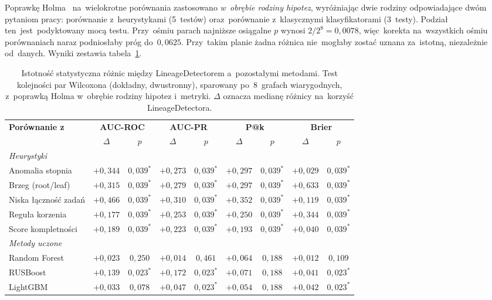 \documentclass[polish,master,a4paper,oneside]{ppfcmthesis}
\renewcommand{\_}{\origtextunderscore\ifmmode\else\allowbreak\fi}
\begin{document}
Poprawkę Holma~\cite{Holm1979} na~wielokrotne porównania zastosowano \emph{w~obrębie rodziny
hipotez}, wyróżniając dwie rodziny odpowiadające dwóm pytaniom pracy:
porównanie z~heurystykami (5~testów) oraz~porównanie z~klasycznymi
klasyfikatorami (3~testy). Podział ten~jest~podyktowany mocą testu. Przy~ośmiu
parach najniższe osiągalne $p$ wynosi $2/2^{8} = 0{,}0078$, więc~korekta
na~wszystkich ośmiu porównaniach naraz podniosłaby próg do~$0{,}0625$.
Przy~takim planie żadna różnica nie~mogłaby zostać uznana za~istotną,
niezależnie od~danych. Wyniki zestawia tabela~\ref{tab:istotnosc}.

\begin{table}[ht]
\centering
\caption[Istotność statystyczna różnic między metodami]{Istotność statystyczna różnic między LineageDetectorem a~pozostałymi
metodami. Test kolejności par Wilcoxona (dokładny, dwustronny), sparowany
po~8~grafach wiarygodnych, z~poprawką Holma w~obrębie rodziny hipotez i~metryki.
$\Delta$ oznacza medianę różnicy na~korzyść LineageDetectora.}
\label{tab:istotnosc}
\small
\begin{tabular}{lcccccccc}
\toprule
\textbf{Porównanie z} & \multicolumn{2}{c}{\textbf{AUC-ROC}} & \multicolumn{2}{c}{\textbf{AUC-PR}} & \multicolumn{2}{c}{\textbf{P@k}} & \multicolumn{2}{c}{\textbf{Brier}} \\
\cmidrule(lr){2-3} \cmidrule(lr){4-5} \cmidrule(lr){6-7} \cmidrule(lr){8-9}
 & $\Delta$ & $p$ & $\Delta$ & $p$ & $\Delta$ & $p$ & $\Delta$ & $p$ \\
\midrule
\multicolumn{9}{l}{\emph{Heurystyki}} \\
Anomalia stopnia & $+0{,}344$ & $0{,}039^{*}$ & $+0{,}273$ & $0{,}039^{*}$ & $+0{,}297$ & $0{,}039^{*}$ & $+0{,}029$ & $0{,}039^{*}$ \\
Brzeg (root/leaf) & $+0{,}315$ & $0{,}039^{*}$ & $+0{,}279$ & $0{,}039^{*}$ & $+0{,}297$ & $0{,}039^{*}$ & $+0{,}633$ & $0{,}039^{*}$ \\
Niska łączność zadań & $+0{,}466$ & $0{,}039^{*}$ & $+0{,}310$ & $0{,}039^{*}$ & $+0{,}352$ & $0{,}039^{*}$ & $+0{,}119$ & $0{,}039^{*}$ \\
Reguła korzenia & $+0{,}177$ & $0{,}039^{*}$ & $+0{,}253$ & $0{,}039^{*}$ & $+0{,}250$ & $0{,}039^{*}$ & $+0{,}344$ & $0{,}039^{*}$ \\
Score kompletności & $+0{,}189$ & $0{,}039^{*}$ & $+0{,}223$ & $0{,}039^{*}$ & $+0{,}193$ & $0{,}039^{*}$ & $+0{,}040$ & $0{,}039^{*}$ \\
\midrule
\multicolumn{9}{l}{\emph{Metody uczone}} \\
Random Forest & $+0{,}023$ & $0{,}250$ & $+0{,}014$ & $0{,}461$ & $+0{,}064$ & $0{,}188$ & $+0{,}012$ & $0{,}109$ \\
RUSBoost & $+0{,}139$ & $0{,}023^{*}$ & $+0{,}172$ & $0{,}023^{*}$ & $+0{,}071$ & $0{,}188$ & $+0{,}041$ & $0{,}023^{*}$ \\
LightGBM & $+0{,}033$ & $0{,}078$ & $+0{,}047$ & $0{,}023^{*}$ & $+0{,}054$ & $0{,}188$ & $+0{,}042$ & $0{,}023^{*}$ \\
\bottomrule
\end{tabular}


\end{table}
\end{document}
